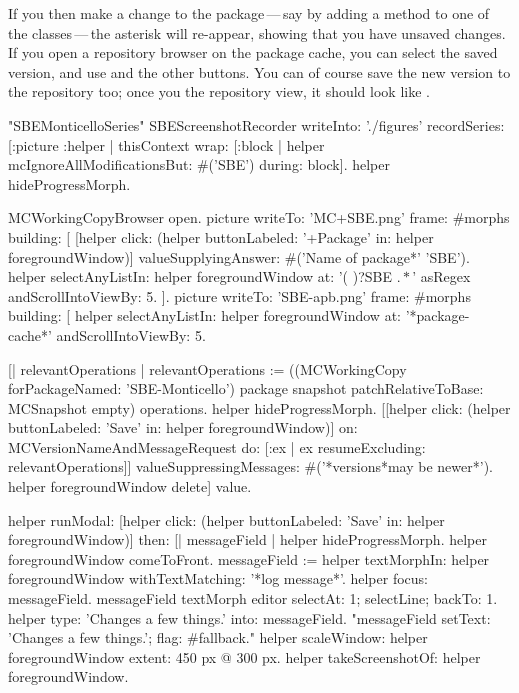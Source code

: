 \documentclass[a4paper,10pt,twoside]{book}
\begin{document}
If you then make a change to the package\,---\,say by adding a method to one of the classes\,---\,the asterisk will re-appear, showing that you have unsaved changes.
If you open a repository browser on the package cache, you can select the saved version, and use  and the other buttons.
You can of course save the new version to the repository too; once you  the repository view, it should look like .

\begin{ExecuteSmalltalkScript}
"SBEMonticelloSeries"
SBEScreenshotRecorder writeInto: './figures' recordSeries: [:picture :helper |
	thisContext wrap: [:block | helper mcIgnoreAllModificationsBut: #('SBE') during: block].
	helper hideProgressMorph.

	MCWorkingCopyBrowser open.
	picture writeTo: 'MC+SBE.png' frame: #morphs building: [
		[helper click: (helper buttonLabeled: '+Package' in: helper foregroundWindow)]
			valueSupplyingAnswer: #('Name of package*' 'SBE').
		helper selectAnyListIn: helper foregroundWindow at: '(\* )?SBE \(.*\)' asRegex andScrollIntoViewBy: 5.
	].
	picture writeTo: 'SBE-apb.png' frame: #morphs building: [
		helper selectAnyListIn: helper foregroundWindow at: '*package-cache*' andScrollIntoViewBy: 5.

		[| relevantOperations |
		relevantOperations := ((MCWorkingCopy forPackageNamed: 'SBE-Monticello') package snapshot
			patchRelativeToBase: MCSnapshot empty) operations.
		helper hideProgressMorph.
		[[helper click: (helper buttonLabeled: 'Save' in: helper foregroundWindow)]
			on: MCVersionNameAndMessageRequest
			do: [:ex | ex resumeExcluding: relevantOperations]]
				valueSuppressingMessages: #('*versions*may be newer*').
		helper foregroundWindow delete] value.

		helper
			runModal: [helper click: (helper buttonLabeled: 'Save' in: helper foregroundWindow)]
			then: [| messageField |
				helper hideProgressMorph.
				helper foregroundWindow comeToFront.
				messageField := helper textMorphIn: helper foregroundWindow withTextMatching: '*log message*'.
				helper focus: messageField.
				messageField textMorph editor selectAt: 1; selectLine; backTo: 1.
				helper type: 'Changes a few things.' into: messageField.
				"messageField setText: 'Changes a few things.'; flag: #fallback."
				helper scaleWindow: helper foregroundWindow extent: 450 px @ 300 px.
				helper takeScreenshotOf: helper foregroundWindow.


\end{ExecuteSmalltalkScript}
\end{document}
